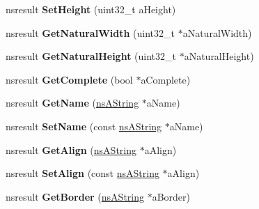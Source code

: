 \begin{DoxyCompactItemize}
nsresult {\bfseries Set\+Height} (uint32\+\_\+t a\+Height)
\item 
\mbox{\label{interfacens_i_d_o_m_h_t_m_l_image_element_ababb9d8eb608a17bd908ef14ffb0a775}} 
nsresult {\bfseries Get\+Natural\+Width} (uint32\+\_\+t $\ast$a\+Natural\+Width)
\item 
\mbox{\label{interfacens_i_d_o_m_h_t_m_l_image_element_a640fae7a62969186c4670aff337eb046}} 
nsresult {\bfseries Get\+Natural\+Height} (uint32\+\_\+t $\ast$a\+Natural\+Height)
\item 
\mbox{\label{interfacens_i_d_o_m_h_t_m_l_image_element_a521a2d9c29d0a99929c3049af8b2fa99}} 
nsresult {\bfseries Get\+Complete} (bool $\ast$a\+Complete)
\item 
\mbox{\label{interfacens_i_d_o_m_h_t_m_l_image_element_a6c0ff772f88e56934275f452ea8e76d4}} 
nsresult {\bfseries Get\+Name} (\hyperlink{structns_string_container}{ns\+A\+String} $\ast$a\+Name)
\item 
\mbox{\label{interfacens_i_d_o_m_h_t_m_l_image_element_aa00b0b2df888843f27efbd15f652d9c3}} 
nsresult {\bfseries Set\+Name} (const \hyperlink{structns_string_container}{ns\+A\+String} $\ast$a\+Name)
\item 
\mbox{\label{interfacens_i_d_o_m_h_t_m_l_image_element_a3c0ac90691fce7d63895af5028547860}} 
nsresult {\bfseries Get\+Align} (\hyperlink{structns_string_container}{ns\+A\+String} $\ast$a\+Align)
\item 
\mbox{\label{interfacens_i_d_o_m_h_t_m_l_image_element_a2174f90424d264e4c66d5cce5edd4900}} 
nsresult {\bfseries Set\+Align} (const \hyperlink{structns_string_container}{ns\+A\+String} $\ast$a\+Align)
\item 
\mbox{\label{interfacens_i_d_o_m_h_t_m_l_image_element_a9228d0822f70a54e5a14ee87c9cfba69}} 
nsresult {\bfseries Get\+Border} (\hyperlink{structns_string_container}{ns\+A\+String} $\ast$a\+Border)

\end{DoxyCompactItemize}
